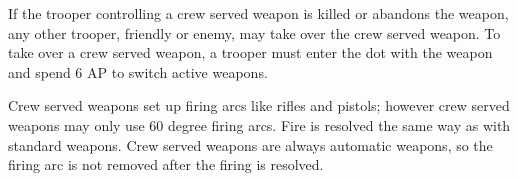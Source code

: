 If the trooper controlling a crew served weapon is killed or abandons the weapon, any other trooper, friendly or enemy, may take over the crew served weapon.
To take over a crew served weapon, a trooper must enter the dot with the weapon and spend 6 AP to switch active weapons.

Crew served weapons set up firing arcs like rifles and pistols; however crew served weapons may only use 60 degree firing arcs.
Fire is resolved the same way as with standard weapons.
Crew served weapons are always automatic weapons, so the firing arc is not removed after the firing is resolved.
